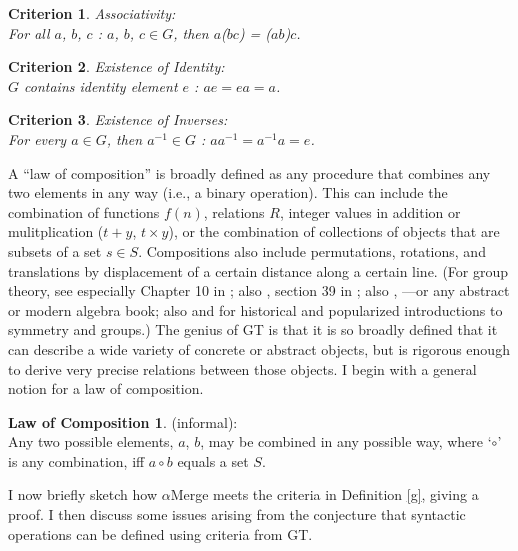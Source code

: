 \documentclass[11pt,twoside]{article}
\theoremstyle{plain}
\newtheorem{criterion}{Criterion}
\numberwithin{equation}{section}
\theoremstyle{definition}
\newtheorem{phrase string}{Phrase String}
\begin{document}
\begin{criterion}
\textsl{Associativity:}\\ For all $a$, $b$, $c$ : $a$, $b$, $c \in G$, then $a$($bc$) = ($ab$)$c$.
\end{criterion}

\begin{criterion}
\textsl{Existence of Identity:}\\ $G$ contains identity element $e$ : $ae = ea = a$.
\end{criterion}

\begin{criterion}
\textsl{Existence of Inverses:}\\ For every $a \in G$, then $a^{-1} \in G$ : $aa^{-1} = a^{-1}a = e$.
\end{criterion}

A ``law of composition'' is broadly defined as any procedure that combines any two elements in any way (i.e., a binary operation). This can include the combination of functions $f(n)$,  relations $R$, integer values in addition or mulitplication ($t + y$, $t \times y$), or the combination of collections of objects that are subsets of a set $s \in S$. Compositions also include permutations, rotations, and translations by displacement of a certain distance along a certain line. (For group theory, see especially Chapter 10 in \cite{pmw:1990}; also \cite{milne:2008}, section 39 in \cite{kleene:1967}; also \cite{korfhage:1974}, \cite{dornhoffhohn:1978}---or any abstract or modern algebra book; also \cite{livio:2005} and \cite{stewart:2007} for historical and popularized introductions to symmetry and groups.) The genius of GT is that it is so broadly defined that it can describe a wide variety of concrete or abstract objects, but is rigorous enough to derive very precise relations between those objects. I begin with a general notion for a law of composition.

\newtheorem*{comp}{Law of Composition}
\begin{comp}
\textsc(informal):\\
Any two possible elements, $a$, $b$, may be combined in any possible way, where `$\circ$' is any combination, iff $a \circ b$ equals a set $S$.
\end{comp}

I now briefly sketch how $\alpha$Merge meets the criteria in Definition \ref{g}, giving a proof. I then discuss some issues arising from the conjecture that syntactic operations can be defined using criteria from GT.
\end{document}
